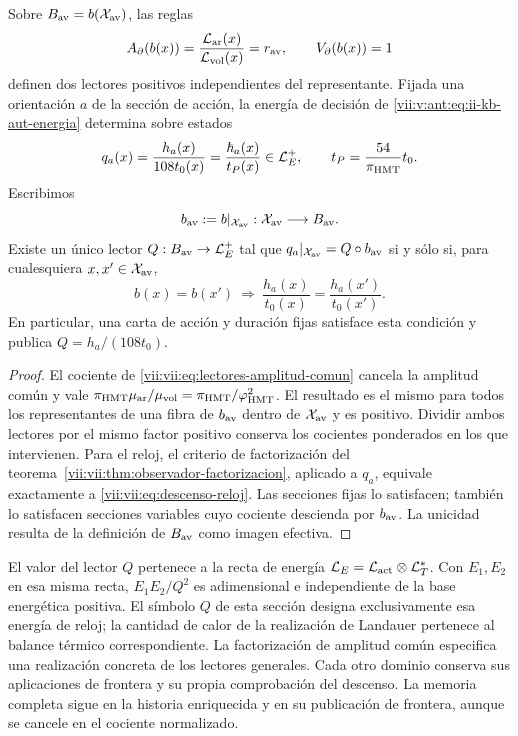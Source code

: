 \begin{proposition}
\label{vii:vii:prop:lectores-frontera-explicitos}
Sobre \(B_{\rm av}=b(\mathcal X_{\rm av})\), las reglas
\begin{equation}
 A_\partial(b(x))
 =\frac{\mathcal L_{\rm ar}(x)}{\mathcal L_{\rm vol}(x)}
 =r_{\rm av},\qquad V_\partial(b(x))=1
 \label{vii:vii:eq:lectores-normalizados}
\end{equation}
definen dos lectores positivos independientes del representante.
Fijada una orientación \(a\) de la sección de acción, la energía de
decisión de \eqref{vii:v:ant:eq:ii-kb-aut-energia} determina sobre estados
\begin{equation}
 q_a(x)=\frac{h_a(x)}{108t_0(x)}
       =\frac{\hbar_a(x)}{t_P(x)}\in\mathcal L_E^+,
 \qquad t_P=\frac{54}{\pi_{\rm HMT}}t_0.
 \label{vii:vii:eq:lector-q-accion}
\end{equation}
Escribimos
\[
 b_{\rm av}:=b|_{\mathcal X_{\rm av}}:
 \mathcal X_{\rm av}\longrightarrow B_{\rm av}.
\]
Existe un único lector \(Q:B_{\rm av}\to\mathcal L_E^+\) tal que
\(q_a|_{\mathcal X_{\rm av}}=Q\circ b_{\rm av}\)
si y sólo si, para cualesquiera \(x,x'\in\mathcal X_{\rm av}\),
\begin{equation}
 b(x)=b(x')\ \Longrightarrow\
 \frac{h_a(x)}{t_0(x)}=\frac{h_a(x')}{t_0(x')}.
 \label{vii:vii:eq:descenso-reloj}
\end{equation}
En particular, una carta de acción y duración fijas satisface esta
condición y publica \(Q=h_a/(108t_0)\).
\end{proposition}
\begin{proof}
El cociente de \eqref{vii:vii:eq:lectores-amplitud-comun} cancela la
amplitud común y vale
\(\pi_{\rm HMT}\mu_{\rm ar}/\mu_{\rm vol}
=\pi_{\rm HMT}/\varphi_{\rm HMT}^2\).
El resultado es el mismo para todos los representantes de una fibra
de \(b_{\rm av}\) dentro de \(\mathcal X_{\rm av}\) y es positivo.
Dividir ambos lectores por el mismo factor positivo
conserva los cocientes ponderados en los que intervienen.
Para el reloj, el criterio de factorización del
teorema~\ref{vii:vii:thm:observador-factorizacion}, aplicado a \(q_a\),
equivale exactamente a \eqref{vii:vii:eq:descenso-reloj}. Las secciones
fijas lo satisfacen; también lo satisfacen secciones variables cuyo
cociente descienda por \(b_{\rm av}\). La unicidad resulta de la definición
de \(B_{\rm av}\) como imagen efectiva.
\end{proof}

El valor del lector \(Q\) pertenece a la recta de energía
\(\mathcal L_E=\mathcal L_{\rm act}\otimes\mathcal L_T^*\).
Con \(E_1,E_2\) en esa misma recta,
\(E_1E_2/Q^2\) es adimensional e independiente de la base energética
positiva. El símbolo \(Q\) de esta sección designa exclusivamente
esa energía de reloj; la cantidad de calor de la realización de
Landauer pertenece al balance térmico correspondiente.
La factorización de amplitud común especifica una realización
concreta de los lectores generales. Cada otro dominio conserva sus
aplicaciones de frontera y su propia comprobación del descenso.
La memoria completa sigue en la historia enriquecida y en su
publicación de frontera, aunque se cancele en el cociente normalizado.


